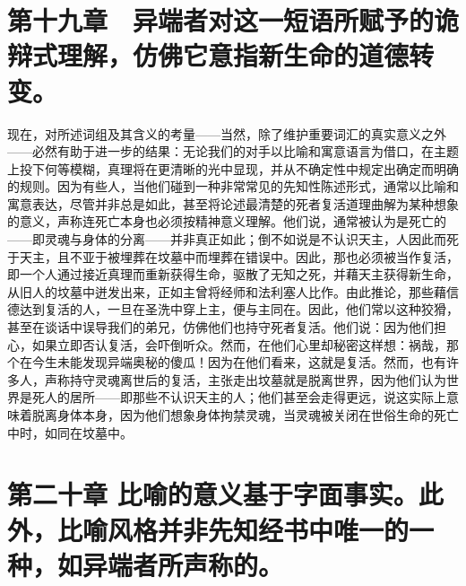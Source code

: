 
\section{第十九章　异端者对这一短语所赋予的诡辩式理解，仿佛它意指新生命的道德转变。}

现在，对所述词组及其含义的考量——当然，除了维护重要词汇的真实意义之外——必然有助于进一步的结果：无论我们的对手以比喻和寓意语言为借口，在主题上投下何等模糊，真理将在更清晰的光中显现，并从不确定性中规定出确定而明确的规则。因为有些人，当他们碰到一种非常常见的先知性陈述形式，通常以比喻和寓意表达，尽管并非总是如此，甚至将论述最清楚的死者复活道理曲解为某种想象的意义，声称连死亡本身也必须按精神意义理解。他们说，通常被认为是死亡的——即灵魂与身体的分离——并非真正如此；倒不如说是不认识天主，人因此而死于天主，且不亚于被埋葬在坟墓中而埋葬在错误中。因此，那也必须被当作复活，即一个人通过接近真理而重新获得生命，驱散了无知之死，并藉天主获得新生命，从旧人的坟墓中迸发出来，正如主曾将经师和法利塞人比作。由此推论，那些藉信德达到复活的人，一旦在圣洗中穿上主，便与主同在。因此，他们常以这种狡猾，甚至在谈话中误导我们的弟兄，仿佛他们也持守死者复活。他们说：因为他们担心，如果立即否认复活，会吓倒听众。然而，在他们心里却秘密这样想：祸哉，那个在今生未能发现异端奥秘的傻瓜！因为在他们看来，这就是复活。然而，也有许多人，声称持守灵魂离世后的复活，主张走出坟墓就是脱离世界，因为他们认为世界是死人的居所——即那些不认识天主的人；他们甚至会走得更远，说这实际上意味着脱离身体本身，因为他们想象身体拘禁灵魂，当灵魂被关闭在世俗生命的死亡中时，如同在坟墓中。\par


\section{第二十章 比喻的意义基于字面事实。此外，比喻风格并非先知经书中唯一的一种，如异端者所声称的。}

